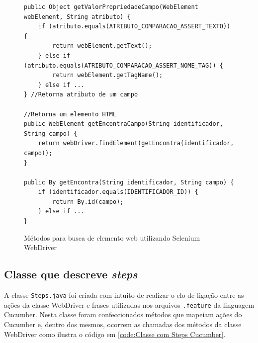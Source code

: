 \documentclass[tg]{mdtufsm}
\begin{document}
\begin{figure}[!htt]
	\begin{lstlisting}
public Object getValorPropriedadeCampo(WebElement webElement, String atributo) {
    if (atributo.equals(ATRIBUTO_COMPARACAO_ASSERT_TEXTO)) {
        return webElement.getText();
    } else if (atributo.equals(ATRIBUTO_COMPARACAO_ASSERT_NOME_TAG)) {
        return webElement.getTagName();
    } else if ...
} //Retorna atributo de um campo

//Retorna um elemento HTML
public WebElement getEncontraCampo(String identificador, String campo) { 
    return webDriver.findElement(getEncontra(identificador, campo));
}

public By getEncontra(String identificador, String campo) {
    if (identificador.equals(IDENTIFICADOR_ID)) {
        return By.id(campo);
    } else if ...
}
	\end{lstlisting}
	\caption{Métodos para busca de elemento web utilizando Selenium WebDriver}
	\label{code:Classe genérica contendo métodos WebDriver}
\end{figure}

\subsection{Classe que descreve \emph{steps}}
A classe \texttt{Steps.java} foi criada com intuito de realizar o elo de ligação entre as ações da classe WebDriver e frases utilizadas nos arquivos \texttt{.feature} da linguagem Cucumber. Nesta classe foram confeccionados métodos que mapeiam ações do Cucumber e, dentro dos mesmos, ocorrem as chamadas dos métodos da classe WebDriver como ilustra o código em \ref{code:Classe com Steps Cucumber}.
\end{document}
